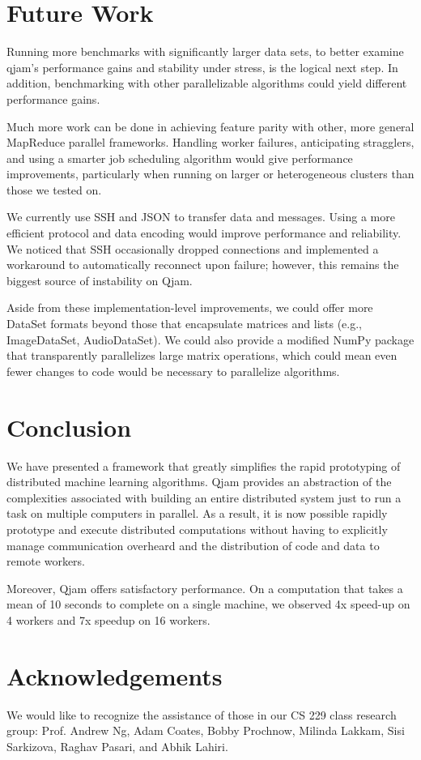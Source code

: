 \documentclass[%
  final,
  notitlepage,
  narroweqnarray,
  inline,
]{ieee}
\begin{document}
\section{Future Work}

Running more benchmarks with significantly larger data sets, to better examine
qjam's performance gains and stability under stress, is the logical next step.
In addition, benchmarking with other parallelizable algorithms could yield
different performance gains.

Much more work can be done in achieving feature parity with other, more general
MapReduce parallel frameworks. Handling worker failures, anticipating
stragglers, and using a smarter job scheduling algorithm would give performance
improvements, particularly when running on larger or heterogeneous clusters
than those we tested on.

We currently use SSH and JSON to transfer data and messages. Using a more
efficient protocol and data encoding would improve performance and
reliability. We noticed that SSH occasionally dropped connections and
implemented a workaround to automatically reconnect upon failure; however, this
remains the biggest source of instability on Qjam.

Aside from these implementation-level improvements, we could offer more DataSet
formats beyond those that encapsulate matrices and lists (e.g., ImageDataSet,
AudioDataSet). We could also provide a modified NumPy package that
transparently parallelizes large matrix operations, which could mean even fewer
changes to code would be necessary to parallelize algorithms.

\section{Conclusion}

We have presented a framework that greatly simplifies the rapid prototyping of
distributed machine learning algorithms. Qjam provides an abstraction of the
complexities associated with building an entire distributed system just to run
a task on multiple computers in parallel. As a result, it is now possible
rapidly prototype and execute distributed computations without having to
explicitly manage communication overheard and the distribution of code and data
to remote workers.

Moreover, Qjam offers satisfactory performance. On a computation that takes a
mean of 10 seconds to complete on a single machine, we observed 4x speed-up on
4 workers and 7x speedup on 16 workers.

\section{Acknowledgements}
We would like to recognize the assistance of those in our CS 229 class research
group: Prof. Andrew Ng, Adam Coates, Bobby Prochnow, Milinda Lakkam, Sisi
Sarkizova, Raghav Pasari, and Abhik Lahiri.




\end{document}
